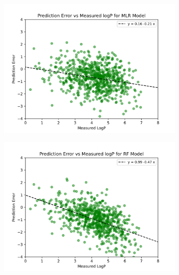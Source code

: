 \documentclass{article}
\begin{document}
\begin{figure}
\captionsetup[subfigure]{justification=Centering}

\begin{subfigure}[t]{0.45\textwidth}
    \includegraphics[width=\textwidth]{./../plots/martel_errors_mlr.png}
\end{subfigure}\hspace{\fill} %
\begin{subfigure}[t]{0.45\textwidth}
    \includegraphics[width=\linewidth]{./../plots/martel_errors_rf.png}
\end{subfigure}


\end{figure}
\end{document}
